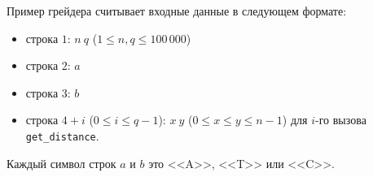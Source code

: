 Пример грейдера считывает входные данные в следующем формате:
\begin{itemize}
\item строка $1$: $n\ q$ ($1 \leq n, q \leq 100\,000$)
\item строка $2$: $a$
\item строка $3$: $b$
\item строка $4 + i$ ($0 \leq i \leq q - 1$): $x\ y$ ($0 \leq x \leq y \leq n-1$) для $i$-го вызова \texttt{get\_distance}. 
\end{itemize}

Каждый символ строк $a$ и $b$ это <<A>>, <<T>> или <<C>>.